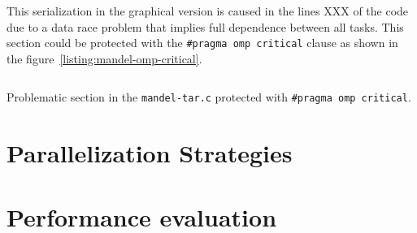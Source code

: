 This serialization in the graphical version is caused in the lines XXX of the code due to a data race problem that implies full dependence between all tasks. This section could be protected with the \texttt{#pragma omp critical} clause as shown in the figure~\ref{listing:mandel-omp-critical}.

\begin{listing}
\inputminted[firstline=8,lastline=8]{c}{sources}
\caption{Problematic section in the \texttt{mandel-tar.c} protected with \texttt{#pragma omp critical}.}
\label{listing:mandel-omp-critical}
\end{listing}



\section{Parallelization Strategies}%
\label{sec:Parallelization Strategies}





\section{Performance evaluation}%
\label{sec:Performance evaluation}



